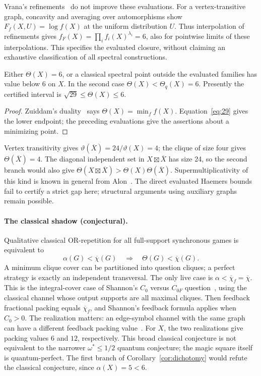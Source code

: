 Vrana's refinements~\cite[Theorems~1.1--1.2]{Vrana} do not improve these
evaluations. For a vertex-transitive graph, concavity and averaging over
automorphisms show $F_f(X,U)=\log f(X)$ at the uniform distribution $U$.
Thus interpolation of refinements gives
$f_F(X)=\prod_i f_i(X)^{\lambda_i}=6$, also for pointwise limits of
these interpolations. This specifies the evaluated closure, without
claiming an exhaustive classification of all spectral constructions.

\begin{corollary}\label{cor:dichotomy}
Either $\Theta(X)=6$, or a classical spectral point outside the evaluated
families has value below $6$ on $X$. In the second case
$\Theta(X)<\Theta_q(X)=6$. Presently the certified interval is
$\sqrt{29}\leq\Theta(X)\leq6$.
\end{corollary}
\begin{proof}
Zuiddam's duality~\cite{Zuiddam} says $\Theta(X)=\min_f f(X)$.
Equation~\eqref{eq:29} gives the lower endpoint; the preceding evaluations
give the assertions about a minimizing point.
\end{proof}
Vertex transitivity gives $\vartheta(\overline X)=24/\vartheta(X)=4$;
the clique of size four gives $\Theta(\overline X)=4$. The diagonal
independent set in $X\boxtimes\overline X$ has size 24, so the second
branch would also give
$\Theta(X\boxtimes\overline X)>\Theta(X)\Theta(\overline X)$.
Supermultiplicativity of this kind is known in general from Alon~\cite{Alon}.
The direct evaluated Haemers bounds fail to certify a strict gap here;
structural arguments using auxiliary graphs remain possible.

\paragraph{The classical shadow (conjectural).}
Qualitative classical OR-repetition for all full-support synchronous
games is equivalent to
\[
 \alpha(G)<\overline\chi(G)\quad\Longrightarrow\quad
 \Theta(G)<\overline\chi(G).
\]
A minimum clique cover can be partitioned into question cliques; a
perfect strategy is exactly an independent transversal. The only live
case is $\alpha<\overline\chi_f=\overline\chi$. This is the integral-cover
case of Shannon's $C_0$ versus $C_{0F}$ question~\cite{Shannon}, using
the classical channel whose output supports are all maximal cliques.
Then feedback fractional packing equals $\overline\chi_f$, and Shannon's
feedback formula applies when $C_0>0$. The realization matters: an
edge-symbol channel with the same graph can have a different feedback
packing value~\cite{CLMW}. For $X$, the two realizations give packing
values $6$ and $12$, respectively. This broad classical conjecture is
not equivalent to the narrower $\omega^*\leq1/2$ quantum conjecture;
the magic square itself is quantum-perfect. The first branch of
Corollary~\ref{cor:dichotomy} would refute the classical conjecture,
since $\alpha(X)=5<6$.
